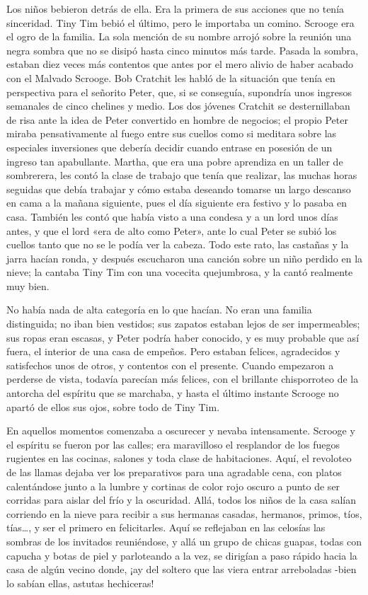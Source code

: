 \documentclass{novela}
\begin{document}
 Los niños bebieron detrás de ella. Era la primera de sus acciones que no tenía sinceridad. Tiny Tim bebió el último, pero le importaba un comino. Scrooge era el ogro de la familia. La sola mención de su nombre arrojó sobre la reunión una negra sombra que no se disipó hasta cinco minutos más tarde. Pasada la sombra, estaban diez veces más contentos que antes por el mero alivio de haber acabado con el Malvado Scrooge. Bob Cratchit les habló de la situación que tenía en perspectiva para el señorito Peter, que, si se conseguía, supondría unos ingresos semanales de cinco chelines y medio. Los dos jóvenes Cratchit se desternillaban de risa ante la idea de Peter convertido en hombre de negocios; el propio Peter miraba pensativamente al fuego entre sus cuellos como si meditara sobre las especiales inversiones que debería decidir cuando entrase en posesión de un ingreso tan apabullante. Martha, que era una pobre aprendiza en un taller de sombrerera, les contó la clase de trabajo que tenía que realizar, las muchas horas seguidas que debía trabajar y cómo estaba deseando tomarse un largo descanso en cama a la mañana siguiente, pues el día siguiente era festivo y lo pasaba en casa. También les contó que había visto a una condesa y a un lord unos días antes, y que el lord «era de alto como Peter», ante lo cual Peter se subió los cuellos tanto que no se le podía ver la cabeza. Todo este rato, las castañas y la jarra hacían ronda, y después escucharon una canción sobre un niño perdido en la nieve; la cantaba Tiny Tim con una vocecita quejumbrosa, y la cantó realmente muy bien.

 No había nada de alta categoría en lo que hacían. No eran una familia distinguida; no iban bien vestidos; sus zapatos estaban lejos de ser impermeables; sus ropas eran escasas, y Peter podría haber conocido, y es muy probable que así fuera, el interior de una casa de empeños. Pero estaban felices, agradecidos y satisfechos unos de otros, y contentos con el presente. Cuando empezaron a perderse de vista, todavía parecían más felices, con el brillante chisporroteo de la antorcha del espíritu que se marchaba, y hasta el último instante Scrooge no apartó de ellos sus ojos, sobre todo de Tiny Tim.

 En aquellos momentos comenzaba a oscurecer y nevaba intensamente. Scrooge y el espíritu se fueron por las calles; era maravilloso el resplandor de los fuegos rugientes en las cocinas, salones y toda clase de habitaciones. Aquí, el revoloteo de las llamas dejaba ver los preparativos para una agradable cena, con platos calentándose junto a la lumbre y cortinas de color rojo oscuro a punto de ser corridas para aislar del frío y la oscuridad. Allá, todos los niños de la casa salían corriendo en la nieve para recibir a sus hermanas casadas, hermanos, primos, tíos, tías{\ldots}, y ser el primero en felicitarles. Aquí se reflejaban en las celosías las sombras de los invitados reuniéndose, y allá un grupo de chicas guapas, todas con capucha y botas de piel y parloteando a la vez, se dirigían a paso rápido hacia la casa de algún vecino donde, ¡ay del soltero que las viera entrar arreboladas -bien lo sabían ellas, astutas hechiceras!
\end{document}
